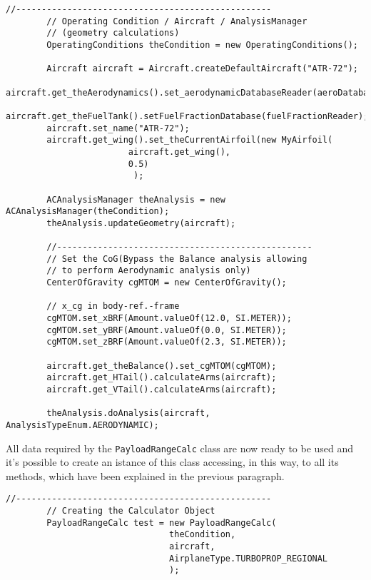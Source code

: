 \begin{lstlisting}[caption={Excerpt of the ATR-72 Payload-Range test - Aircraft, OperatingConditions and ACAnalysisManager setup}, captionpos=b, tabsize=2]
		//--------------------------------------------------
		// Operating Condition / Aircraft / AnalysisManager 
		// (geometry calculations)
		OperatingConditions theCondition = new OperatingConditions();
		
		Aircraft aircraft = Aircraft.createDefaultAircraft("ATR-72");
		aircraft.get_theAerodynamics().set_aerodynamicDatabaseReader(aeroDatabaseReader);
		aircraft.get_theFuelTank().setFuelFractionDatabase(fuelFractionReader);
		aircraft.set_name("ATR-72");
		aircraft.get_wing().set_theCurrentAirfoil(new MyAirfoil(
						aircraft.get_wing(),
						0.5)
						 );		
		
		ACAnalysisManager theAnalysis = new ACAnalysisManager(theCondition);
		theAnalysis.updateGeometry(aircraft);
		
		//--------------------------------------------------
		// Set the CoG(Bypass the Balance analysis allowing
		// to perform Aerodynamic analysis only)
		CenterOfGravity cgMTOM = new CenterOfGravity();

		// x_cg in body-ref.-frame
		cgMTOM.set_xBRF(Amount.valueOf(12.0, SI.METER)); 
		cgMTOM.set_yBRF(Amount.valueOf(0.0, SI.METER));
		cgMTOM.set_zBRF(Amount.valueOf(2.3, SI.METER));

		aircraft.get_theBalance().set_cgMTOM(cgMTOM);
		aircraft.get_HTail().calculateArms(aircraft);
		aircraft.get_VTail().calculateArms(aircraft);
		
		theAnalysis.doAnalysis(aircraft, AnalysisTypeEnum.AERODYNAMIC);
\end{lstlisting}

\bigskip
\noindent
All data required by the \lstinline[language=Java]!PayloadRangeCalc! class are now ready to be used and it’s possible to create an istance of this class accessing, in this way, to all its methods, which have been explained in the previous paragraph. 

\bigskip
\begin{lstlisting}[caption={Excerpt of the ATR-72 Payload-Range test - Payload-Range class istance creation}, captionpos=b, tabsize=2]
		//--------------------------------------------------
		// Creating the Calculator Object
		PayloadRangeCalc test = new PayloadRangeCalc(
								theCondition, 
								aircraft,
								AirplaneType.TURBOPROP_REGIONAL
								);
\end{lstlisting}

